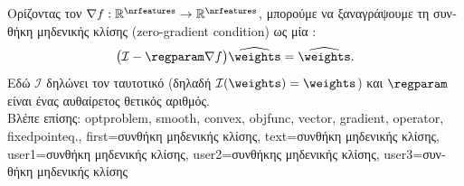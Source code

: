 {{		\foreignlanguage{greek}{Ορίζοντας τον}   
		$\nabla f: \mathbb{R}^{\nrfeatures} \rightarrow \mathbb{R}^{\nrfeatures}$, \foreignlanguage{greek}{μπορούμε να ξαναγράψουμε
		τη συνθήκη μηδενικής κλίσης} (zero-gradient condition) \foreignlanguage{greek}{ως μία} :
		$$ \big( \mathcal{I} - \regparam \nabla f\big) \widehat{\weights} = \widehat{\weights}.$$ 
		\foreignlanguage{greek}{Εδώ $\mathcal{I}$ δηλώνει τον ταυτοτικό}  \foreignlanguage{greek}{(δηλαδή 
		$\mathcal{I}(\weights) = \weights$) και $\regparam$ είναι ένας αυθαίρετος θετικός αριθμός}. 
		\\
		\foreignlanguage{greek}{Βλέπε επίσης:} \gls{optproblem}, \gls{smooth}, \gls{convex}, \gls{objfunc}, \gls{vector}, \gls{gradient}, 
		\gls{operator}, \gls{fixedpointeq}.}, 
	first={\foreignlanguage{greek}{συνθήκη μηδενικής κλίσης}},
	text={\foreignlanguage{greek}{συνθήκη μηδενικής κλίσης}},
	user1={\foreignlanguage{greek}{συνθήκη μηδενικής κλίσης}}, %
	user2={\foreignlanguage{greek}{συνθήκης μηδενικής κλίσης}}, %
	user3={\foreignlanguage{greek}{συνθήκη μηδενικής κλίσης}} %
}

